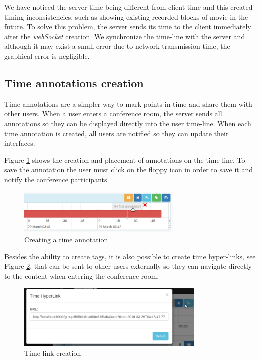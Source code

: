 	We have noticed the server time being different from client time and this created timing inconsistencies, such as showing existing recorded blocks of movie in the future. To solve this problem, the server sends its time to the client immediately after the \emph{webSocket} creation. We synchronize the time-line with the server and although it may exist a small error due to network transmission time, the graphical error is negligible. 


	\subsection{Time annotations creation}

	Time annotations are a simpler way to mark points in time and share them with other users. When a user enters a conference room, the server sends all annotations so they can be displayed directly into the user time-line. When each time annotation is created, all users are notified so they can update their interfaces.

	Figure \ref{fig:annotation} shows the creation and placement of annotations on the time-line. To save the annotation the user must click on the floppy icon in order to save it and notify the conference participants. 

	\begin{figure}
		\centering
		\includegraphics[width=0.7\textwidth]{figures/annotation.png}
		\caption{Creating a time annotation}
		\label{fig:annotation}
	\end{figure}

	Besides the ability to create tags, it is also possible to create time hyper-links, see Figure \ref{fig:timelink}, that can be sent to other users externally so they can navigate directly to the content when entering the conference room.


	\begin{figure}
		\centering
		\includegraphics[width=0.8\textwidth]{figures/timelink.png}
		\caption{Time link creation}
		\label{fig:timelink}
	\end{figure}


